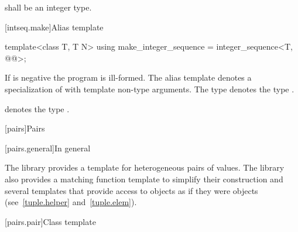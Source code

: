 \pnum
{} shall be an integer type.

[intseq.make]{Alias template }

%
\begin{itemdecl}
template<class T, T N>
  using make_integer_sequence = integer_sequence<T, @\seebelow{}@>;
\end{itemdecl}

\begin{itemdescr}
\pnum
If  is negative the program is ill-formed. The alias template
 denotes a specialization of
 with  template non-type arguments.
The type  denotes the type
.
\begin{note}
 denotes the type
.
\end{note}
\end{itemdescr}

[pairs]{Pairs}

[pairs.general]{In general}

\pnum
The library provides a template for heterogeneous pairs of values.
The library also provides a matching function template to simplify
their construction and several templates that provide access to 
objects as if they were  objects (see~\ref{tuple.helper}
and~\ref{tuple.elem}).%
%
%
%

[pairs.pair]{Class template }

